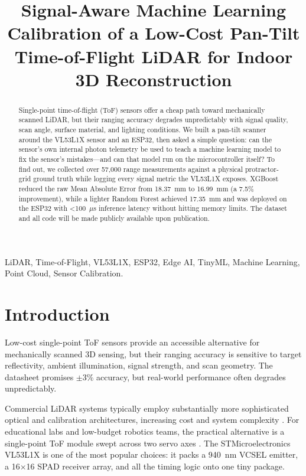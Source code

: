 \documentclass[conference, a4paper]{IEEEtran}
\begin{document}
\title{Signal-Aware Machine Learning Calibration of a Low-Cost Pan-Tilt Time-of-Flight LiDAR for Indoor 3D Reconstruction}

\author{
}

\maketitle

\begin{abstract}
Single-point time-of-flight (ToF) sensors offer a cheap path toward mechanically scanned LiDAR, but their ranging accuracy degrades unpredictably with signal quality, scan angle, surface material, and lighting conditions. We built a pan-tilt scanner around the VL53L1X sensor and an ESP32, then asked a simple question: can the sensor's own internal photon telemetry be used to teach a machine learning model to fix the sensor's mistakes---and can that model run on the microcontroller itself? To find out, we collected over 57,000 range measurements against a physical protractor-grid ground truth while logging every signal metric the VL53L1X exposes. XGBoost reduced the raw Mean Absolute Error from 18.37~mm to 16.99~mm (a 7.5\% improvement), while a lighter Random Forest achieved 17.35~mm and was deployed on the ESP32 with <100~$\mu$s inference latency without hitting memory limits. The dataset and all code will be made publicly available upon publication.
\end{abstract}

\begin{IEEEkeywords}
LiDAR, Time-of-Flight, VL53L1X, ESP32, Edge AI, TinyML, Machine Learning, Point Cloud, Sensor Calibration.
\end{IEEEkeywords}

\section{Introduction}
Low-cost single-point ToF sensors provide an accessible alternative for mechanically scanned 3D sensing, but their ranging accuracy is sensitive to target reflectivity, ambient illumination, signal strength, and scan geometry. The datasheet promises $\pm$3\% accuracy, but real-world performance often degrades unpredictably.

Commercial LiDAR systems typically employ substantially more sophisticated optical and calibration architectures, increasing cost and system complexity \cite{amann2001laser, behroozpour2017lidar}. For educational labs and low-budget robotics teams, the practical alternative is a single-point ToF module swept across two servo axes \cite{willis2009design}. The STMicroelectronics VL53L1X \cite{stmicro2018vl53l1x} is one of the most popular choices: it packs a 940~nm VCSEL emitter, a 16$\times$16 SPAD receiver array, and all the timing logic onto one tiny package.
\end{document}

